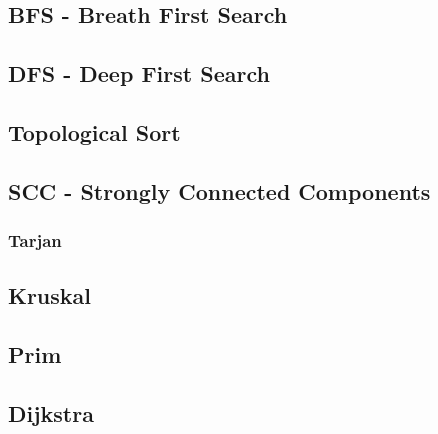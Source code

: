 \subsection{BFS - Breath First Search}
\subsection{DFS - Deep First Search}
\subsection{Topological Sort}
\subsection{SCC - Strongly Connected Components}
\subsubsection{Tarjan}
\subsection{Kruskal}
\subsection{Prim}
\subsection{Dijkstra}